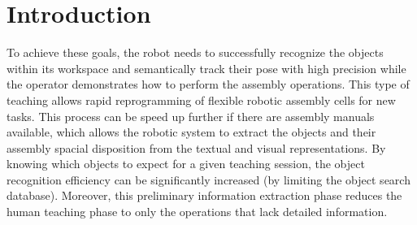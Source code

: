 \section{Introduction}\label{sec:introduction}

To achieve these goals, the robot needs to successfully recognize the objects within its workspace and semantically track their pose with high precision while the operator demonstrates how to perform the assembly operations. This type of teaching allows rapid reprogramming of flexible robotic assembly cells for new tasks. This process can be speed up further if there are assembly manuals available, which allows the robotic system to extract the objects and their assembly spacial disposition from the textual and visual representations. By knowing which objects to expect for a given teaching session, the object recognition efficiency can be significantly increased (by limiting the object search database). Moreover, this preliminary information extraction phase reduces the human teaching phase to only the operations that lack detailed information.
